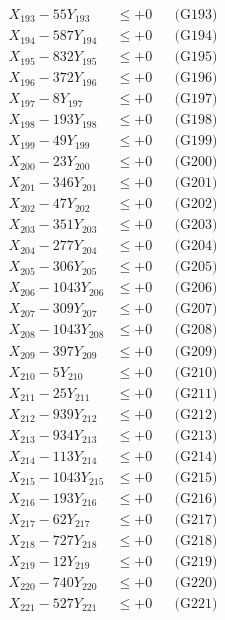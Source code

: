 \documentclass[a4paper,10pt]{article}
\begin{document}
{\begin{align}
X_{193} - 55Y_{193} &\leq +0 && \text{(G193)} \\
X_{194} - 587Y_{194} &\leq +0 && \text{(G194)} \\
X_{195} - 832Y_{195} &\leq +0 && \text{(G195)} \\
X_{196} - 372Y_{196} &\leq +0 && \text{(G196)} \\
X_{197} - 8Y_{197} &\leq +0 && \text{(G197)} \\
X_{198} - 193Y_{198} &\leq +0 && \text{(G198)} \\
X_{199} - 49Y_{199} &\leq +0 && \text{(G199)} \\
X_{200} - 23Y_{200} &\leq +0 && \text{(G200)} \\
\allowbreak
X_{201} - 346Y_{201} &\leq +0 && \text{(G201)} \\
X_{202} - 47Y_{202} &\leq +0 && \text{(G202)} \\
X_{203} - 351Y_{203} &\leq +0 && \text{(G203)} \\
X_{204} - 277Y_{204} &\leq +0 && \text{(G204)} \\
X_{205} - 306Y_{205} &\leq +0 && \text{(G205)} \\
X_{206} - 1043Y_{206} &\leq +0 && \text{(G206)} \\
X_{207} - 309Y_{207} &\leq +0 && \text{(G207)} \\
X_{208} - 1043Y_{208} &\leq +0 && \text{(G208)} \\
X_{209} - 397Y_{209} &\leq +0 && \text{(G209)} \\
X_{210} - 5Y_{210} &\leq +0 && \text{(G210)} \\
\allowbreak
X_{211} - 25Y_{211} &\leq +0 && \text{(G211)} \\
X_{212} - 939Y_{212} &\leq +0 && \text{(G212)} \\
X_{213} - 934Y_{213} &\leq +0 && \text{(G213)} \\
X_{214} - 113Y_{214} &\leq +0 && \text{(G214)} \\
X_{215} - 1043Y_{215} &\leq +0 && \text{(G215)} \\
X_{216} - 193Y_{216} &\leq +0 && \text{(G216)} \\
X_{217} - 62Y_{217} &\leq +0 && \text{(G217)} \\
X_{218} - 727Y_{218} &\leq +0 && \text{(G218)} \\
X_{219} - 12Y_{219} &\leq +0 && \text{(G219)} \\
X_{220} - 740Y_{220} &\leq +0 && \text{(G220)} \\
\allowbreak
X_{221} - 527Y_{221} &\leq +0 && \text{(G221)} \\

\end{align}}
\end{document}
